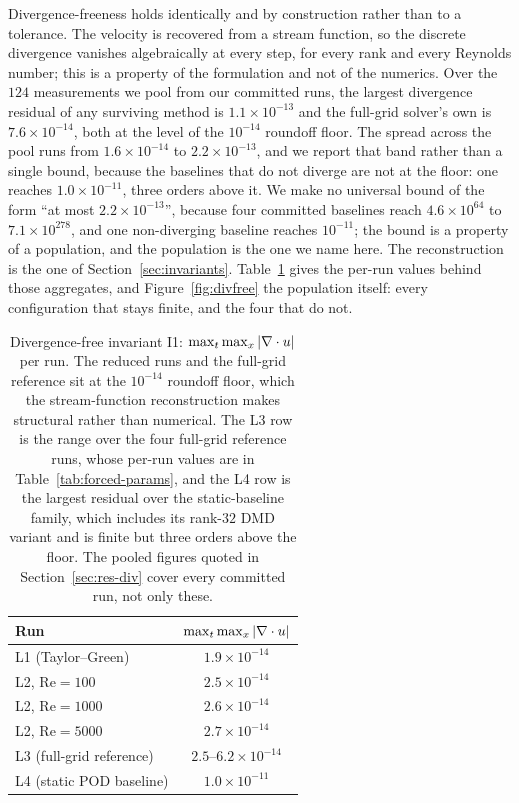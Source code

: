 Divergence-freeness holds identically and by construction rather than to a
tolerance. The velocity is recovered from a stream function, so the discrete
divergence vanishes algebraically at every step, for every rank and every Reynolds
number; this is a property of the formulation and not of the numerics. Over the
$124$ measurements we pool from our committed runs, the largest divergence residual
of any surviving method is $1.1\times 10^{-13}$ and the full-grid solver's own is
$7.6\times 10^{-14}$, both at the level of the $10^{-14}$ roundoff floor. The spread
across the pool runs from $1.6\times 10^{-14}$ to $2.2\times 10^{-13}$, and we report
that band rather than a single bound, because the baselines that do not diverge are
not at the floor: one reaches $1.0\times 10^{-11}$, three orders above it. We make no
universal bound of the form ``at most $2.2\times 10^{-13}$'', because four committed
baselines reach $4.6\times 10^{64}$ to $7.1\times 10^{278}$, and one non-diverging
baseline reaches $10^{-11}$; the bound is a property of a population, and the population
is the one we name here.
The reconstruction is the one of Section~\ref{sec:invariants}.
Table~\ref{tab:div} gives the per-run values behind those aggregates, and
Figure~\ref{fig:divfree} the population itself: every configuration that stays
finite, and the four that do not.

\begin{table}[t]
  \centering
  \begin{tabular}{lc}
    \toprule
    Run & $\max_t \max_x |\nabla \cdot u|$ \\
    \midrule
    L1 (Taylor--Green)        & $1.9\times 10^{-14}$ \\
    L2, $\mathrm{Re}=100$     & $2.5\times 10^{-14}$ \\
    L2, $\mathrm{Re}=1000$    & $2.6\times 10^{-14}$ \\
    L2, $\mathrm{Re}=5000$    & $2.7\times 10^{-14}$ \\
    L3 (full-grid reference)  & $2.5$--$6.2\times 10^{-14}$ \\
    L4 (static POD baseline)  & $1.0\times 10^{-11}$ \\
    \bottomrule
  \end{tabular}
  \caption{Divergence-free invariant I1: $\max_t \max_x |\nabla \cdot u|$ per
  run. The reduced runs and the full-grid reference sit at the $10^{-14}$
  roundoff floor, which the stream-function reconstruction makes structural
  rather than numerical. The L3 row is the range over the four full-grid
  reference runs, whose per-run values are in
  Table~\ref{tab:forced-params}, and the L4 row is the largest residual over the
  static-baseline family, which includes its rank-$32$ DMD variant and is
  finite but three orders above the floor. The pooled figures quoted in
  Section~\ref{sec:res-div} cover every committed run, not only these.}
  \label{tab:div}
\end{table}

